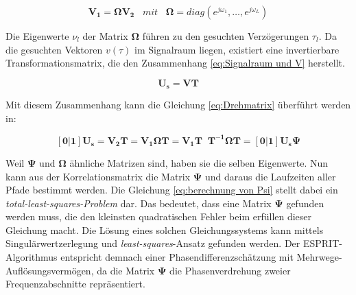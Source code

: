 \begin{equation}
	\label{eq:Drehmatrix}
	\mathbf{V_1} = \mathbf{\Omega V_2}  \;\;\;  mit \;\;\; \mathbf{\Omega} = diag(e^{j\omega_1}, \ldots, e^{j\omega_L} )
\end{equation} 

Die Eigenwerte $\nu_l$ der Matrix $\mathbf{\Omega}$ führen zu den gesuchten Verzögerungen $\tau_l$.
Da die gesuchten Vektoren $v(\tau)$ im Signalraum liegen, existiert eine invertierbare Transformationsmatrix, die den Zusammenhang \eqref{eq:Signalraum und V} herstellt.  

\begin{equation}
	\label{eq:Signalraum und V}
	\mathbf{U_s} = \mathbf{VT}
\end{equation}

Mit diesem Zusammenhang kann die Gleichung \eqref{eq:Drehmatrix} überführt werden in:

\begin{equation}
	\label{eq:berechnung von Psi}
	\mathbf{[0|1]U_s} = \mathbf{V_2T} = \mathbf{V_1\Omega T} = \mathbf{V_1T} \;\;\mathbf{T^{-1}\Omega T} = \mathbf{[0|1]U_s \Psi}
\end{equation}

Weil $\mathbf{\Psi}$ und $\mathbf{\Omega}$ ähnliche Matrizen sind, haben sie die selben Eigenwerte. 
Nun kann aus der Korrelationsmatrix die Matrix $\mathbf{\Psi}$ und daraus die Laufzeiten aller Pfade bestimmt werden. Die Gleichung \eqref{eq:berechnung von Psi} stellt dabei ein \emph{total-least-squares-Problem} dar. 
Das bedeutet, dass eine Matrix $\mathbf{\Psi}$ gefunden werden muss, die den kleinsten quadratischen Fehler beim erfüllen dieser Gleichung macht.
Die Lösung eines solchen Gleichungssystems kann mittels Singulärwertzerlegung und \emph{least-squares}-Ansatz gefunden werden.
Der ESPRIT-Algorithmus entspricht demnach einer Phasendifferenzschätzung mit Mehrwege-Auflösungsvermögen, da die Matrix $\mathbf{\Psi}$ die Phasenverdrehung zweier Frequenzabschnitte repräsentiert. 



